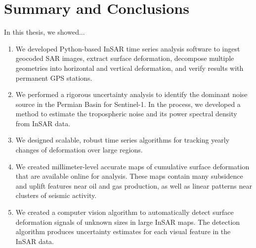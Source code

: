 
\chapter{Summary and Conclusions}
\label{CHAP:7}

In this thesis, we showed...



\begin{enumerate}
	
	\item We developed Python-based InSAR time series analysis software to ingest geocoded SAR images, extract surface deformation, decompose multiple geometries into horizontal and vertical deformation, and verify results with permanent GPS stations.
	
	\item We performed a rigorous uncertainty analysis to identify the dominant noise source in the Permian Basin for Sentinel-1.  In the process, we developed a method to estimate the tropospheric noise and its power spectral density from InSAR data.
	
	\item We designed scalable, robust time series algorithms for tracking yearly changes of deformation over large regions.
	
	\item We created millimeter-level accurate maps of cumulative surface deformation that are available online for analysis. These maps contain many subsidence and uplift features near oil and gas production, as well as linear patterns near clusters of seismic activity.
	
	\item We created a computer vision algorithm to automatically detect surface deformation signals of unknown sizes in large InSAR maps. The detection algorithm produces uncertainty estimates for each visual feature in the InSAR data.
	
	
	
\end{enumerate}






